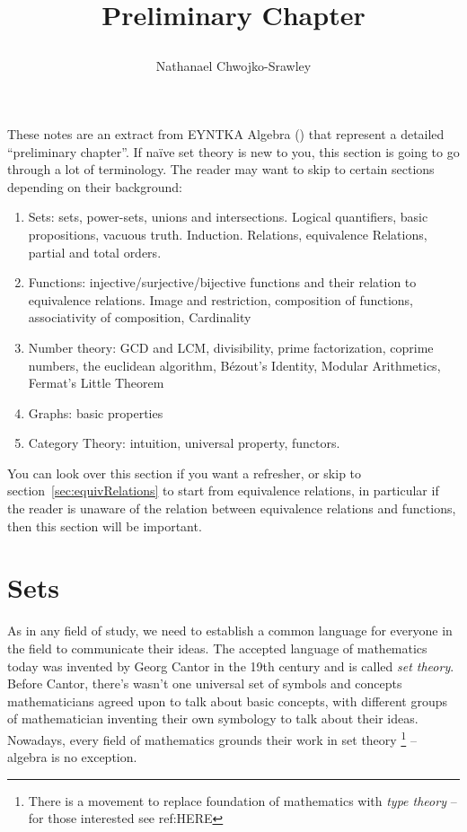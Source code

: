 \documentclass{book}
\title{
	\begin{huge}
		\bf{Preliminary Chapter}
	\end{huge}
	}
\author{Nathanael Chwojko-Srawley}
\begin{document}
\maketitle
\tableofcontents

\newpage
These notes are an extract from EYNTKA Algebra (\cite{NateAlgebra}) that represent a detailed ``preliminary
chapter''. If na\"ive set theory is new to you, this section is going to go through a lot of terminology. The
reader may want to skip to certain sections depending on their background:
\begin{enumerate}
	\item Sets: sets, power-sets, unions and intersections. Logical quantifiers, basic propositions, vacuous
		truth. Induction. Relations, equivalence Relations, partial and total orders.
	\item Functions: injective/surjective/bijective functions and their relation to equivalence
		relations. Image and restriction, composition of functions, associativity of composition, Cardinality
	\item Number theory: GCD and LCM, divisibility, prime factorization, coprime numbers, the euclidean
		algorithm, B\'ezout's Identity, Modular Arithmetics, Fermat's Little Theorem
	\item Graphs: basic properties
	\item Category Theory: intuition, universal property, functors.
\end{enumerate}
You can look over this section if you want a refresher, or skip to section~\ref{sec:equivRelations} to start
from equivalence relations, in particular if the reader is unaware of the relation between equivalence
relations and functions, then this section will be important.

\section{Sets}

As in any field of study, we need to establish a common language for everyone in the field to communicate their ideas.
The accepted language of mathematics today was invented by Georg Cantor in the 19th century and is called \emph{set
theory}. Before Cantor, there's wasn't one universal set of symbols and concepts mathematicians agreed upon to talk
about basic concepts, with different groups of mathematician inventing their own symbology to talk about their ideas.
Nowadays, every field of mathematics grounds their work in set theory \footnote{There is a movement to replace
foundation of mathematics with \emph{type theory} -- for those interested see ref:HERE
} -- algebra is no exception.
\end{document}
